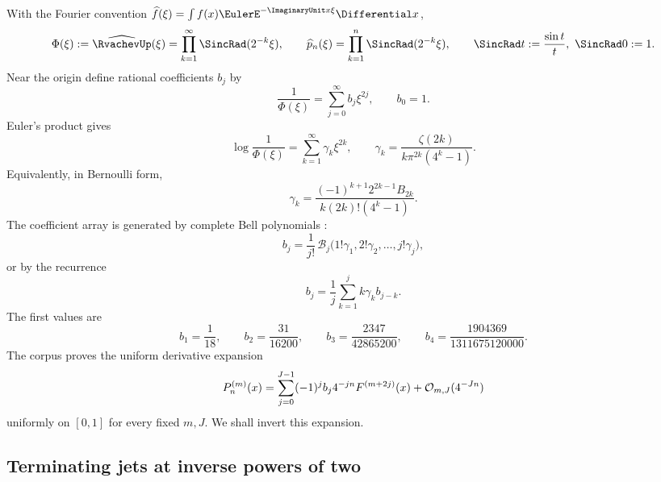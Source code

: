 \documentclass[11pt,oneside]{article}
\numberwithin{equation}{section}
\theoremstyle{definition}
\theoremstyle{remark}
\newcommand{\Fn}{P_n}
\begin{document}
With the Fourier convention $\widehat f(\xi)=\int f(x)\EulerE^{-\ImaginaryUnit x\xi}\Differential x$,
\begin{equation}
 \Phi(\xi):=\widehat\RvachevUp(\xi)
 =\prod_{k=1}^{\infty}\SincRad(2^{-k}\xi),
 \qquad
 \widehat p_n(\xi)=\prod_{k=1}^{n}\SincRad(2^{-k}\xi),\qquad\SincRad t:=\frac{\sin t}{t},\ \SincRad0:=1.
 \label{p1:eq:Phi-products}
\end{equation}
Near the origin define rational coefficients $b_j$ by
\begin{equation}
 \frac1{\Phi(\xi)}=\sum_{j=0}^{\infty}b_j\xi^{2j},
 \qquad b_0=1.
 \label{p1:eq:b-def}
\end{equation}
Euler's product gives
\begin{equation}
 \log\frac1{\Phi(\xi)}=\sum_{k=1}^{\infty}\gamma_k\xi^{2k},
 \qquad
 \gamma_k=\frac{\zeta(2k)}{k\pi^{2k}(4^k-1)}.
 \label{p1:eq:gamma-def}
\end{equation}
Equivalently, in Bernoulli form,
\begin{equation}
 \gamma_k=\frac{(-1)^{k+1}2^{2k-1}B_{2k}}
 {k(2k)!(4^k-1)}.
 \label{p1:eq:gamma-Bernoulli}
\end{equation}
The coefficient array is generated by complete Bell polynomials \cite{p1:Comtet}:
\begin{equation}
 \boxed{
 b_j=\frac1{j!}\,
 \mathcal B_j\bigl(1!\gamma_1,2!\gamma_2,\ldots,j!\gamma_j\bigr),}
 \label{p1:eq:b-Bell}
\end{equation}
or by the recurrence
\begin{equation}
 b_j=\frac1j\sum_{k=1}^{j}k\gamma_kb_{j-k}.
 \label{p1:eq:b-rec}
\end{equation}
The first values are
\begin{equation}
 b_1=\frac1{18},\qquad
 b_2=\frac{31}{16200},\qquad
 b_3=\frac{2347}{42865200},\qquad
 b_4=\frac{1904369}{1311675120000}.
 \label{p1:eq:b-first}
\end{equation}
The corpus proves the uniform derivative expansion
\begin{equation}
 \Fn^{(m)}(x)=
 \sum_{j=0}^{J-1}(-1)^jb_j4^{-jn}F^{(m+2j)}(x)
 +\BigO_{m,J}(4^{-Jn})
 \label{p1:eq:forward-prefix-expansion}
\end{equation}
uniformly on $[0,1]$ for every fixed $m,J$.  We shall invert this expansion.

\subsection{Terminating jets at inverse powers of two}
\end{document}
